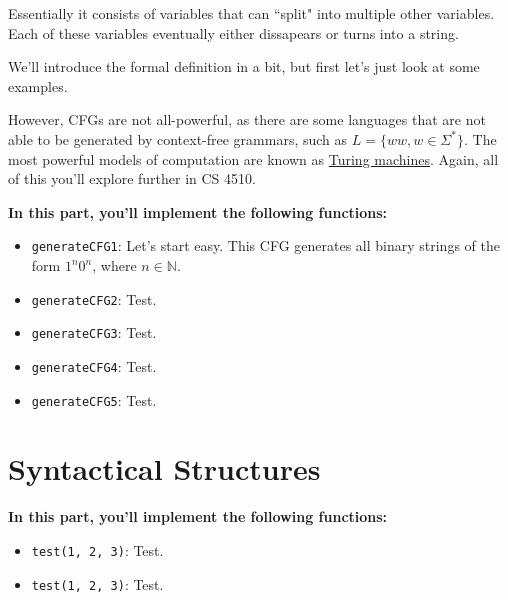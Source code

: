 \documentclass{article}
\begin{document}
    Essentially it consists of variables that can ``split" into multiple other variables. Each of these variables eventually either dissapears or turns into a string.
    
    
    We'll introduce the formal definition in a bit, but first let's just look at some examples. 


    However, CFGs are not all-powerful, as there are some languages that are not able to be generated by context-free grammars, such as $L = \{ww, w \in \Sigma^{*}\}$. The most powerful models of computation are known as \href{https://www.google.com/doodles/alan-turings-100th-birthday}{Turing machines}. Again, all of this you'll explore further in CS 4510.

\begin{tcolorbox}[enhanced,interior style={top color=Dandelion!20,bottom color=Dandelion!30}]
    \textbf{In this part, you'll implement the following functions:}
    \begin{itemize}
        \item \lstinline{generateCFG1}: Let's start easy. This CFG generates all binary strings of the form $1^{n}0^{n}$, where $n \in \mathbb{N}$.
        \item \lstinline{generateCFG2}: Test.
        \item \lstinline{generateCFG3}: Test.
        \item \lstinline{generateCFG4}: Test.
        \item \lstinline{generateCFG5}: Test.
    \end{itemize}
\end{tcolorbox}



\section*{Syntactical Structures}



\begin{tcolorbox}[enhanced,interior style={top color=Dandelion!20,bottom color=Dandelion!30}]
    \textbf{In this part, you'll implement the following functions:}
    \begin{itemize}
        \item \lstinline{test(1, 2, 3)}: Test.
        \item \lstinline{test(1, 2, 3)}: Test.
    \end{itemize}
\end{tcolorbox}
\end{document}
